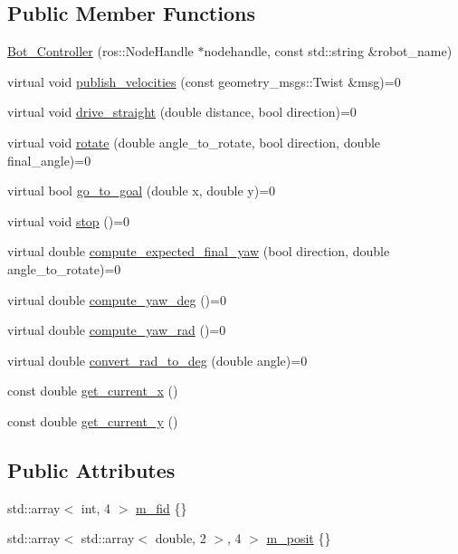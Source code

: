 \subsection*{Public Member Functions}
\begin{DoxyCompactItemize}
\item 
\hyperlink{class_bot___controller_a05104e1b41f7c9cd9cdfe80bbbd53a7d}{Bot\+\_\+\+Controller} (ros\+::\+Node\+Handle $\ast$nodehandle, const std\+::string \&robot\+\_\+name)
\item 
virtual void \hyperlink{class_bot___controller_ae357ee9ea3ec7a5000f39532fc52fa72}{publish\+\_\+velocities} (const geometry\+\_\+msgs\+::\+Twist \&msg)=0
\item 
virtual void \hyperlink{class_bot___controller_afff936a963b8b3b4b641a7f152b45166}{drive\+\_\+straight} (double distance, bool direction)=0
\item 
virtual void \hyperlink{class_bot___controller_a19ba7ced629e4ee9a0743efdef4a5cc7}{rotate} (double angle\+\_\+to\+\_\+rotate, bool direction, double final\+\_\+angle)=0
\item 
virtual bool \hyperlink{class_bot___controller_a5e2f980d71dab69d952c532b5819483b}{go\+\_\+to\+\_\+goal} (double x, double y)=0
\item 
virtual void \hyperlink{class_bot___controller_a28d1caa8c0ed9d8fb313caacecc5e71b}{stop} ()=0
\item 
virtual double \hyperlink{class_bot___controller_a836b1e434c1c15ccec0b81313a32aca8}{compute\+\_\+expected\+\_\+final\+\_\+yaw} (bool direction, double angle\+\_\+to\+\_\+rotate)=0
\item 
virtual double \hyperlink{class_bot___controller_abda61292c3719a4a5676ddcd0d8311a1}{compute\+\_\+yaw\+\_\+deg} ()=0
\item 
virtual double \hyperlink{class_bot___controller_a362541183536f955e54234e14f18f3c2}{compute\+\_\+yaw\+\_\+rad} ()=0
\item 
virtual double \hyperlink{class_bot___controller_a722a49277ba04f303ca588d80a4910c3}{convert\+\_\+rad\+\_\+to\+\_\+deg} (double angle)=0
\item 
const double \hyperlink{class_bot___controller_a2efd33efbb2d3c8caa52e04a049b5971}{get\+\_\+current\+\_\+x} ()
\item 
const double \hyperlink{class_bot___controller_a5985b03ff6787846a5abf5cd85ed6ae2}{get\+\_\+current\+\_\+y} ()
\end{DoxyCompactItemize}
\subsection*{Public Attributes}
\begin{DoxyCompactItemize}
\item 
std\+::array$<$ int, 4 $>$ \hyperlink{class_bot___controller_a397be472573c291e96f2d0b201e31643}{m\+\_\+fid} \{\}
\item 
std\+::array$<$ std\+::array$<$ double, 2 $>$, 4 $>$ \hyperlink{class_bot___controller_ac1318ffd8b630e459194f68e9a6573e2}{m\+\_\+posit} \{\}
\end{DoxyCompactItemize}
